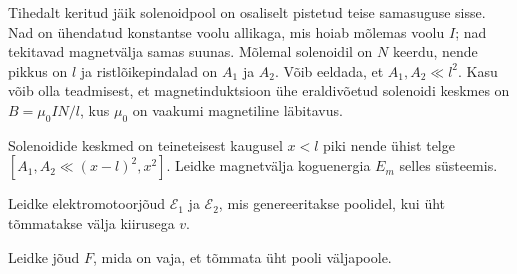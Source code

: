 \documentclass[a4paper,11pt,twocolumn]{article}
\begin{document}
\begin{question}[E-S 2015, P9]
	Tihedalt keritud jäik solenoidpool on osaliselt pistetud teise samasuguse sisse. Nad on ühendatud konstantse voolu allikaga, mis hoiab mõlemas voolu $I$; nad tekitavad magnetvälja samas suunas. Mõlemal solenoidil on $N$ keerdu, nende pikkus on $l$ ja ristlõikepindalad on $A_1$ ja $A_2$. Võib eeldada, et $A_1,A_2 \ll l^{2}$. Kasu võib olla teadmisest, et magnetinduktsioon ühe eraldivõetud solenoidi keskmes on $B = \mu_0 IN/l$, kus $\mu_0$ on vaakumi magnetiline läbitavus.
	\begin{subquestion}
		\item Solenoidide keskmed on teineteisest kaugusel $x < l$ piki nende ühist telge \( [A_1, A_2 \ll (x - l)^{2}, x^{2}] \). Leidke magnetvälja koguenergia $E_m$ selles süsteemis.
		\item Leidke elektromotoorjõud $\mathcal{E}_1$ ja $\mathcal{E}_2$, mis genereeritakse poolidel, kui üht tõmmatakse välja kiirusega $v$.
		\item Leidke jõud $F$, mida on vaja, et tõmmata üht pooli väljapoole.
	\end{subquestion}
\end{question}
\end{document}
